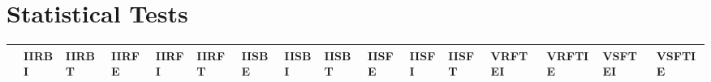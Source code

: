 \documentclass[a4paper,12pt]{article}
\begin{document}
\section{Statistical Tests}
\label{app:stat}
\newpage\cleardoublepage{}
\thispagestyle{empty}
\begin{landscape}
\begin{table}
\caption{Student t-test and Wilcoxon test results for 100x20 instances}
\label{app:stat/table/100x20}
\tiny
\tabcolsep=0.11cm
\begin{longtable}{|l|l|l|l|l|l|l|l|l|l|l|l|l|l|l|l|}
\hline
& \textbf{IIRBI} & \textbf{IIRBT} & \textbf{IIRFE} & \textbf{IIRFI} & \textbf{IIRFT} & \textbf{IISBE} & \textbf{IISBI} & \textbf{IISBT} & \textbf{IISFE} & \textbf{IISFI} & \textbf{IISFT} & \textbf{VRFTEI} & \textbf{VRFTIE} & \textbf{VSFTEI} & \textbf{VSFTIE}\\
\hline

\end{longtable}
\end{table}
\end{landscape}
\end{document}
